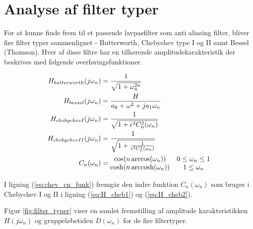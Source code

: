 \section{Analyse af filter typer}\label{sec:filter_analyse}
For at kunne finde frem til et passende lavpasfilter som anti aliasing filter, bliver fire filter typer sammenlignet - Butterworth, Chebyshev type I og II samt Bessel (Thomson).
Hver af disse filtre har en tilhørende amplitudekarakteristik der beskrives med følgende overføringsfunktioner\cite{anfilter}.

\begin{align} 
H_{butterworth}(j\omega_n) &= \frac{1}{\sqrt{1 + \omega_n^{2n}}} \label{eq:H_butt} \\
H_{bessel} (j\omega_n) &= \frac{H}{a_0 + \omega^2 + ja_1\omega_n} \label{eq:H_bes}\\
H_{chebychevI}(j\omega_n) &= \frac{1}{\sqrt{1 + \epsilon^2 C_n^2(\omega_n)}} \label{eq:H_cheb1} \\
H_{chebychevII}(j\omega_n) &= \frac{1}{\sqrt{1 + \frac{1}{\epsilon^2 C_n^2(\omega_n)}}} \label{eq:H_cheb2} \\
C_n(\omega_n) &=  
\begin{matrix}
	\cos(n\arccos(\omega_n)) & 0 \le \omega_n \le 1 \\  \cosh(n \operatorname{arccosh}(\omega_n)) & 1 \le \omega_n 
\end{matrix} \label{eq:chev_cn_funk}
\end{align}

I ligning (\ref{eq:chev_cn_funk}) fremgår den indre funktion $C_n(\omega_n)$ som bruges i Chebychev I og II i ligning (\ref{eq:H_cheb1}) og (\ref{eq:H_cheb2}).

Figur \ref{fig:filter_typer} viser en samlet fremstilling af amplitude karakteristikken $H(j\omega_n)$ og gruppeløbetiden $D(\omega_n)$ for de fire filtertyper.

